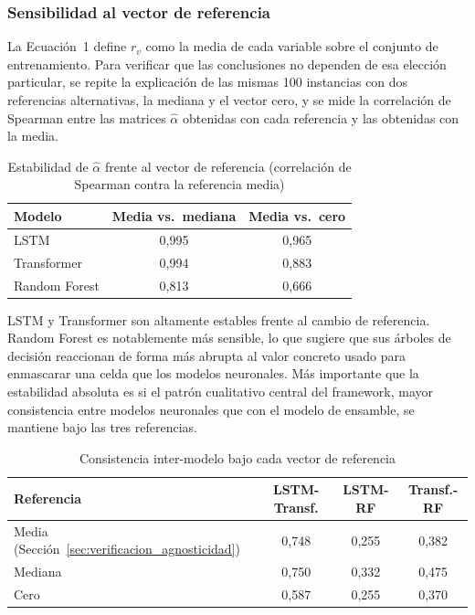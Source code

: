 \documentclass[conference, letterpaper]{IEEEtran}
\begin{document}
\subsubsection{Sensibilidad al vector de referencia}

La Ecuación~1 define $r_v$ como la media de cada variable sobre el
conjunto de entrenamiento. Para verificar que las conclusiones no
dependen de esa elección particular, se repite la explicación de las
mismas 100 instancias con dos referencias alternativas, la mediana y
el vector cero, y se mide la correlación de Spearman entre las
matrices $\hat{\alpha}$ obtenidas con cada referencia y las obtenidas
con la media.

\begin{table}[h]
\centering
\caption{Estabilidad de $\hat{\alpha}$ frente al vector de
referencia (correlación de Spearman contra la referencia media)}
\label{tab:ref_stability}
\begin{tabular}{lcc}
\toprule
\textbf{Modelo} & \textbf{Media vs.\ mediana} & \textbf{Media vs.\ cero} \\
\midrule
LSTM          & 0{,}995 & 0{,}965 \\
Transformer   & 0{,}994 & 0{,}883 \\
Random Forest & 0{,}813 & 0{,}666 \\
\bottomrule
\end{tabular}
\end{table}

LSTM y Transformer son altamente estables frente al cambio de
referencia. Random Forest es notablemente más sensible, lo que
sugiere que sus árboles de decisión reaccionan de forma más abrupta
al valor concreto usado para enmascarar una celda que los modelos
neuronales. Más importante que la estabilidad absoluta es si el
patrón cualitativo central del framework, mayor consistencia entre
modelos neuronales que con el modelo de ensamble, se mantiene bajo
las tres referencias.

\begin{table}[h]
\centering
\caption{Consistencia inter-modelo bajo cada vector de referencia}
\label{tab:consistencia_por_referencia}
\begin{tabular}{lccc}
\toprule
\textbf{Referencia} & \textbf{LSTM-Transf.} & \textbf{LSTM-RF} & \textbf{Transf.-RF} \\
\midrule
Media (Sección~\ref{sec:verificacion_agnosticidad}) & 0{,}748 & 0{,}255 & 0{,}382 \\
Mediana & 0{,}750 & 0{,}332 & 0{,}475 \\
Cero    & 0{,}587 & 0{,}255 & 0{,}370 \\
\bottomrule
\end{tabular}
\end{table}
\end{document}
